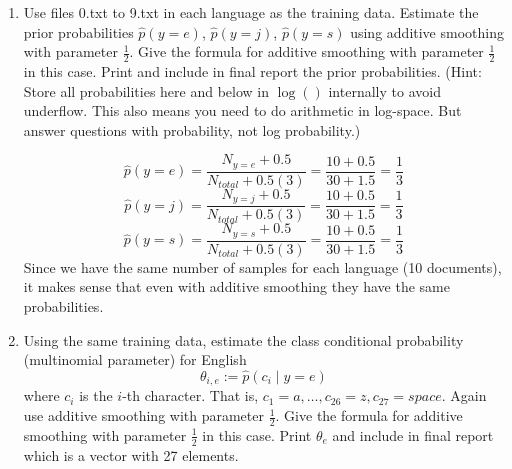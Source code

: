 \documentclass[a4paper]{article}
\theoremstyle{definition}
\newenvironment{soln}{
    \leavevmode\color{blue}\ignorespaces
}{}
\begin{document}
\begin{enumerate}
\item
Use files 0.txt to 9.txt in each language as the training data.
Estimate the prior probabilities 
$\hat p(y=e)$,
$\hat p(y=j)$,
$\hat p(y=s)$
using additive smoothing with parameter $\frac{1}{2}$. 
Give the formula for additive smoothing with parameter $\frac{1}{2}$ in this case. 
Print and include in final report the prior probabilities.
(Hint: Store all probabilities here and below in $\log()$ internally to avoid underflow. This also means you need to do arithmetic in log-space.  But answer questions with probability, not log probability.)

\begin{soln}
	$$\hat p(y = e) = \frac{N_{y=e} + 0.5}{N_{total} + 0.5(3)} = \frac{10 + 0.5}{30 + 1.5} = \frac{1}{3}$$
	$$\hat p(y = j) = \frac{N_{y=j} + 0.5}{N_{total} + 0.5(3)} = \frac{10 + 0.5}{30 + 1.5} = \frac{1}{3}$$
	$$\hat p(y = s) = \frac{N_{y=s} + 0.5}{N_{total} + 0.5(3)} = \frac{10 + 0.5}{30 + 1.5} = \frac{1}{3}$$
	Since we have the same number of samples for each language (10 documents), it makes sense that even with additive smoothing they have the same probabilities.
\end{soln}

\item
Using the same training data, estimate the class conditional probability (multinomial parameter) for English
$$\theta_{i,e} := \hat p(c_i \mid y=e)$$ 
where $c_i$ is the $i$-th character. That is, $c_1 = a, \ldots, c_{26} = z, c_{27} = space$.
Again use additive smoothing with parameter $\frac{1}{2}$.
Give the formula for additive smoothing with parameter $\frac{1}{2}$ in this case. 
Print $\theta_e$ and include in final report which is a vector with 27 elements.


\end{enumerate}
\end{document}
